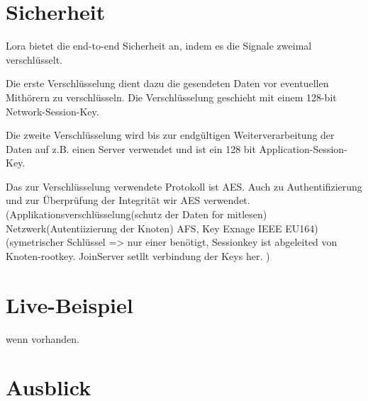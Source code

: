 \documentclass[a4paper,12pt]{article}
\begin{document}
    \section{Sicherheit} \label{sec:Sicherheit}
        Lora bietet die end-to-end Sicherheit an, indem es die Signale zweimal verschlüsselt.

        Die erste Verschlüsselung dient dazu die gesendeten Daten vor eventuellen Mithörern zu verschlüsseln. Die Verschlüsselung geschieht mit einem 128-bit Network-Session-Key.

        Die zweite Verschlüsselung wird bis zur endgültigen Weiterverarbeitung der Daten auf z.B. einen Server verwendet und ist ein 128 bit Application-Session-Key.

        Das zur Verschlüsselung verwendete Protokoll ist AES. Auch zu Authentifizierung und zur Überprüfung der Integrität wir AES verwendet.
        \cite{LoRaSecur}
            \cite{WhatIsLoRa}(Applikationsverschlüsselung(schutz der Daten for mitlesen) Netzwerk(Autentiizierung der Knoten) AFS, Key Exnage IEEE EU164)
            \cite{LoRaSpec}(symetrischer Schlüssel => nur einer benötigt, Sessionkey ist abgeleited von Knoten-rootkey. JoinServer setllt verbindung der Keys her.
            )
    \section{Live-Beispiel}
        wenn vorhanden.

    \section{Ausblick}
        \newpage
    
    
\end{document}
